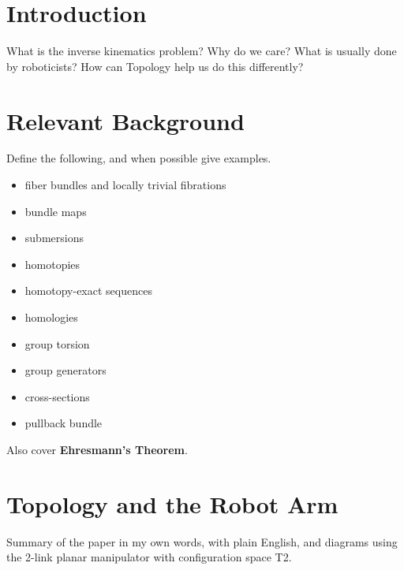 \documentclass[12pt]{article}
\begin{document}
\cite{program-kin-red-manips}
\cite{robots-fiber-bundles}
\cite{topology-fiber-bundles}
\cite{topology-robot-arm}
    
\section{Introduction}
What is the inverse kinematics problem? Why do we care? What is usually done by
roboticists? How can Topology help us do this differently?

\section{Relevant Background}
Define the following, and when possible give examples.
\begin{itemize}
    \item fiber bundles and locally trivial fibrations
    \item bundle maps
    \item submersions
    \item homotopies
    \item homotopy-exact sequences
    \item homologies
    \item group torsion
    \item group generators
    \item cross-sections
    \item pullback bundle
\end{itemize}
Also cover \textbf{Ehresmann's Theorem}.

\section{Topology and the Robot Arm}
Summary of the paper in my own words, with plain English, and diagrams using the
2-link planar manipulator with configuration space T2.
\printbibliography
\end{document}
